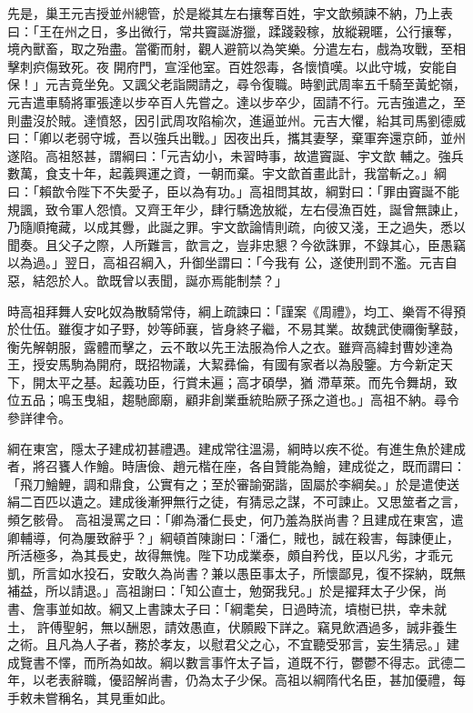 \begin{pinyinscope}
 先是，巢王元吉授並州總管，於是縱其左右攘奪百姓，宇文歆頻諫不納，乃上表曰：「王在州之日，多出微行，常共竇誕游獵，蹂踐穀稼，放縱親暱，公行攘奪，境內獸畜，取之殆盡。當衢而射，觀人避箭以為笑樂。分遣左右，戲為攻戰，至相擊刺疻傷致死。夜
 開府門，宣淫他室。百姓怨毒，各懷憤嘆。以此守城，安能自保！」元吉竟坐免。又諷父老詣闕請之，尋令復職。時劉武周率五千騎至黃蛇嶺，元吉遣車騎將軍張達以步卒百人先嘗之。達以步卒少，固請不行。元吉強遣之，至則盡沒於賊。達憤怒，因引武周攻陷榆次，進逼並州。元吉大懼，紿其司馬劉德威曰：「卿以老弱守城，吾以強兵出戰。」因夜出兵，攜其妻孥，棄軍奔還京師，並州遂陷。高祖怒甚，謂綱曰：「元吉幼小，未習時事，故遣竇誕、宇文歆
 輔之。強兵數萬，食支十年，起義興運之資，一朝而棄。宇文歆首畫此計，我當斬之。」綱曰：「賴歆令陛下不失愛子，臣以為有功。」高祖問其故，綱對曰：「罪由竇誕不能規諷，致令軍人怨憤。又齊王年少，肆行驕逸放縱，左右侵漁百姓，誕曾無諫止，乃隨順掩藏，以成其釁，此誕之罪。宇文歆論情則疏，向彼又淺，王之過失，悉以聞奏。且父子之際，人所難言，歆言之，豈非忠懇？今欲誅罪，不錄其心，臣愚竊以為過。」翌日，高祖召綱入，升御坐謂曰：「今我有
 公，遂使刑罰不濫。元吉自惡，結怨於人。歆既曾以表聞，誕亦焉能制禁？」



 時高祖拜舞人安叱奴為散騎常侍，綱上疏諫曰：「謹案《周禮》，均工、樂胥不得預於仕伍。雖復才如子野，妙等師襄，皆身終子繼，不易其業。故魏武使禰衡擊鼓，衡先解朝服，露體而擊之，云不敢以先王法服為伶人之衣。雖齊高緯封曹妙達為王，授安馬駒為開府，既招物議，大絜彞倫，有國有家者以為殷鑒。方今新定天下，開太平之基。起義功臣，行賞未遍；高才碩學，猶
 滯草萊。而先令舞胡，致位五品；鳴玉曳組，趨馳廊廟，顧非創業垂統貽厥子孫之道也。」高祖不納。尋令參詳律令。



 綱在東宮，隱太子建成初甚禮遇。建成常往溫湯，綱時以疾不從。有進生魚於建成者，將召饔人作鱠。時唐儉、趙元楷在座，各自贊能為鱠，建成從之，既而謂曰：「飛刀鱠鯉，調和鼎食，公實有之；至於審諭弼諧，固屬於李綱矣。」於是遣使送絹二百匹以遺之。建成後漸狎無行之徒，有猜忌之謀，不可諫止。又思筮者之言，頻乞骸骨。
 高祖漫罵之曰：「卿為潘仁長史，何乃羞為朕尚書？且建成在東宮，遣卿輔導，何為屢致辭乎？」綱頓首陳謝曰：「潘仁，賊也，誠在殺害，每諫便止，所活極多，為其長史，故得無愧。陛下功成業泰，頗自矜伐，臣以凡劣，才乖元凱，所言如水投石，安敢久為尚書？兼以愚臣事太子，所懷鄙見，復不探納，既無補益，所以請退。」高祖謝曰：「知公直士，勉弼我兒。」於是擢拜太子少保，尚書、詹事並如故。綱又上書諫太子曰：「綱耄矣，日過時流，墳樹已拱，幸未就土，
 許傅聖躬，無以酬恩，請效愚直，伏願殿下詳之。竊見飲酒過多，誠非養生之術。且凡為人子者，務於孝友，以慰君父之心，不宜聽受邪言，妄生猜忌。」建成覽書不懌，而所為如故。綱以數言事忤太子旨，道既不行，鬱鬱不得志。武德二年，以老表辭職，優詔解尚書，仍為太子少保。高祖以綱隋代名臣，甚加優禮，每手敕未嘗稱名，其見重如此。




\end{pinyinscope}
